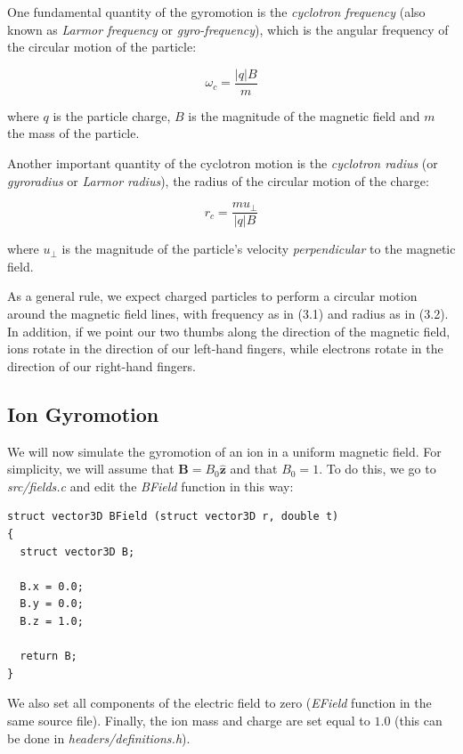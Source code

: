 \documentclass[11pt]{report}
\begin{document}
One fundamental quantity of the gyromotion is the \emph{cyclotron frequency} (also known as \emph{Larmor frequency} or \emph{gyro-frequency}), which is the angular frequency of the circular motion of the particle:

\begin{equation}
\omega_c = \frac{|q|B}{m}
\end{equation}

where $q$ is the particle charge, $B$ is the magnitude of the magnetic field and $m$ the mass of the particle.
\newline

Another important quantity of the cyclotron motion is the \emph{cyclotron radius} (or \emph{gyroradius} or \emph{Larmor radius}), the radius of the circular motion of the charge:

\begin{equation}
r_c = \frac{m u_{\bot}}{|q|B}
\end{equation}

where $u_{\bot}$ is the magnitude of the particle's velocity \emph{perpendicular} to the magnetic field.
\newline

As a general rule, we expect charged particles to perform a circular motion around the magnetic field lines, with frequency as in (3.1) and radius as in (3.2). In addition, if we point our two thumbs along the direction of the magnetic field, ions rotate in the direction of our left-hand fingers, while electrons rotate in the direction of our right-hand fingers. 

\subsection{Ion Gyromotion}
We will now simulate the gyromotion of an ion in a uniform magnetic field. For simplicity, we will assume that $\bm{B} = B_0 \hat{\bm{z}}$ and that $B_0 = 1$. To do this, we go to \emph{src/fields.c} and edit the \emph{BField} function in this way:

\begin{lstlisting}
struct vector3D BField (struct vector3D r, double t)
{
  struct vector3D B;

  B.x = 0.0;
  B.y = 0.0;
  B.z = 1.0;

  return B;
}
\end{lstlisting}

We also set all components of the electric field to zero (\emph{EField} function in the same source file). Finally, the ion mass and charge are set equal to $1.0$ (this can be done in \emph{headers/definitions.h}).
\newline 
\end{document}

